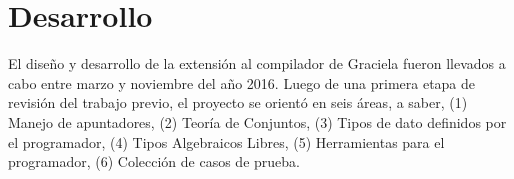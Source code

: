 \chapter{Desarrollo}
\label{capitulo3}


El diseño y desarrollo de la extensión al compilador de Graciela fueron llevados
a cabo entre marzo y noviembre del año 2016. Luego de una primera etapa de
revisión del trabajo previo, el proyecto se orientó en seis áreas, a saber,
(1) Manejo de apuntadores, (2) Teoría de Conjuntos, (3) Tipos de dato definidos
por el programador, (4) Tipos Algebraicos Libres, (5) Herramientas para el
programador, (6) Colección de casos de prueba.

%
%

